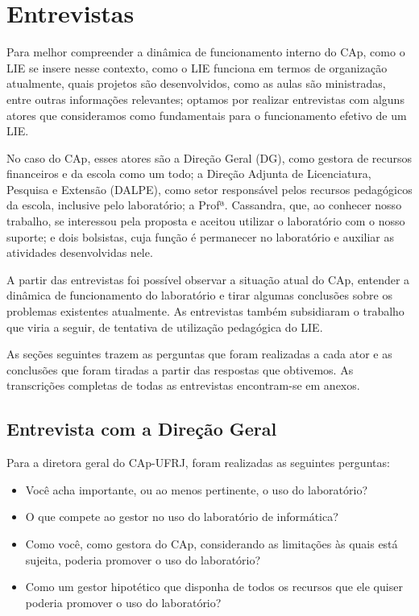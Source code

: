\chapter{Entrevistas}\label{chp:LABEL_CHP_ENT}

Para melhor compreender a dinâmica de funcionamento interno do CAp, como o LIE se insere nesse contexto, como o LIE funciona em termos de organização atualmente, quais projetos são desenvolvidos, como as aulas são ministradas, entre outras informações relevantes; optamos por realizar entrevistas com alguns atores que consideramos como fundamentais para o funcionamento efetivo de um LIE.

No caso do CAp, esses atores são a Direção Geral (DG), como gestora de recursos financeiros e da escola como um todo; a Direção Adjunta de Licenciatura, Pesquisa e Extensão (DALPE), como setor responsável pelos recursos pedagógicos da escola, inclusive pelo laboratório; a Profª. Cassandra, que, ao conhecer nosso trabalho, se interessou pela proposta e aceitou utilizar o laboratório com o nosso suporte; e dois bolsistas, cuja função é permanecer no laboratório e auxiliar as atividades desenvolvidas nele.

A partir das entrevistas foi possível observar a situação atual do CAp, entender a dinâmica de funcionamento do laboratório e tirar algumas conclusões sobre os problemas existentes atualmente. As entrevistas também subsidiaram o trabalho que viria a seguir, de tentativa de utilização pedagógica do LIE.

As seções seguintes trazem as perguntas que foram realizadas a cada ator e as conclusões que foram tiradas a partir das respostas que obtivemos. As transcrições completas de todas as entrevistas encontram-se em anexos.

\section{Entrevista com a Direção Geral}\label{chp:LABEL_CHP_ENT_SEC_DG}

Para a diretora geral do CAp-UFRJ, foram realizadas as seguintes perguntas:
\begin{itemize}
\item Você acha importante, ou ao menos pertinente, o uso do laboratório?
\item O que compete ao gestor no uso do laboratório de informática?
\item Como você, como gestora do CAp, considerando as limitações às quais está sujeita, poderia promover o uso do laboratório?
\item Como um gestor hipotético que disponha de todos os recursos que ele quiser poderia promover o uso do laboratório?
\end{itemize}

